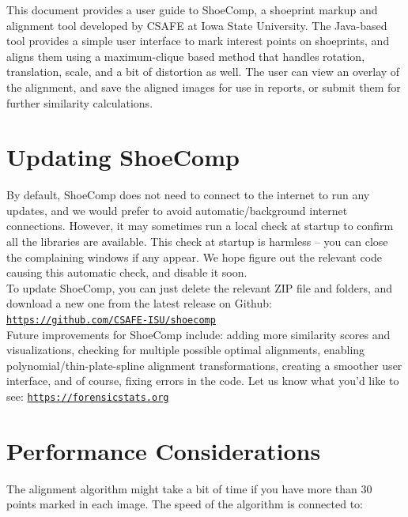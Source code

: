 \documentclass[a4paper, oneside]{memoir}
\newcommand{\selfref}[1]{\texttt{\href{#1}{#1}}}
\begin{document}
This document provides a user guide to ShoeComp, a shoeprint markup and alignment tool
developed by CSAFE at Iowa State University. The Java-based tool provides a simple user
interface to mark interest points on shoeprints, and aligns them using a maximum-clique
based method that handles rotation, translation, scale, and a bit of distortion as well.
The user can view an overlay of the alignment, and save the aligned images for use in
reports, or submit them for further similarity calculations.

\section{Updating ShoeComp}

By default, ShoeComp does not need to connect to the internet to run any updates, and we
would prefer to avoid automatic/background internet connections. However, it may sometimes
run a local check at startup to confirm all the libraries are available. This check at
startup is harmless -- you can close the complaining windows if any appear. We hope figure
out the relevant code causing this automatic check, and disable it soon. \\

To update ShoeComp, you can just delete the relevant ZIP file and folders, and download a
new one from the latest release on Github: \selfref{https://github.com/CSAFE-ISU/shoecomp}
\\

Future improvements for ShoeComp include: adding more similarity scores and visualizations,
checking for multiple possible optimal alignments, enabling polynomial/thin-plate-spline
alignment transformations, creating a smoother user interface, and of course, fixing
errors in the code. Let us know what you'd like to see:
\selfref{https://forensicstats.org}

\section{Performance Considerations}

The alignment algorithm might take a bit of time if you have more than 30 points marked in
each image. The speed of the algorithm is connected to:
\end{document}
